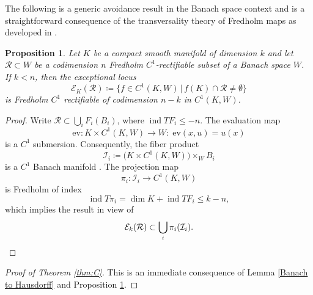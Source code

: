 \documentclass[11pt,a4paper]{article}
\newtheorem{prop}[theorem]{Proposition}
\theoremstyle{definition}
\DeclareMathOperator{\ind}{ind}
\newcommand{\cE}{\mathcal{E}}
\newcommand{\cI}{\mathcal{I}}
\newcommand{\cR}{\mathcal{R}}
\newcommand{\ev}{\mathrm{ev}}
\begin{document}
The following is a generic avoidance result in the Banach space context and is a straightforward consequence of the transversality theory of Fredholm maps as developed in \cite[Chapter 4]{AR67}.

\begin{prop}\label{Generic avoidance for Banach}
  Let $K$ be a compact smooth manifold of dimension $k$ and let $\cR \subset W$ be a codimension $n$ Fredholm $C^1$-rectifiable subset of a Banach space $W$. If $k < n$, then the exceptional locus
  \begin{equation*}
    \cE_K (\cR) \coloneq \{ f \in C^1(K, W) \, | \, f(K) \cap \cR \neq \emptyset \}
  \end{equation*}
  is Fredholm $C^1$ rectifiable of codimension $n-k$ in $C^1(K, W)$.
\end{prop}

\begin{proof}
  Write $\cR \subset \bigcup_i F_i (B_i)$, where $\ind TF_i \leq -n$. The evaluation map 
  \begin{equation*}
    \ev: K \times C^1(K, W) \to W: \; \ev(x, u) = u(x)
  \end{equation*}
  is a $C^1$ submersion. Consequently, the fiber product 
  \begin{equation*}
    \cI_i \coloneq \big(K \times C^1(K, W)\big) \times_W B_i
  \end{equation*}
  is a $C^1$ Banach manifold \cite[Corollary 17.2]{AR67}. The projection map 
  \begin{equation*}
    \pi_i: \cI_i \to C^1(K, W)
  \end{equation*}
  is Fredholm of index 
  \begin{equation*}
    \ind T \pi_i = \dim K + \ind TF_i \leq k-n,
  \end{equation*}
  which implies the result in view of 
  \begin{equation*}
    \cE_k(\cR) \subset \bigcup_i \pi_i (\cI_i). \qedhere
  \end{equation*}
\end{proof}

\begin{proof}[Proof of Theorem \ref{thm:C}]
  This is an immediate consequence of Lemma \ref{Banach to Hausdorff} and Proposition \ref{Generic avoidance for Banach}.
\end{proof} 
  

\end{document}
